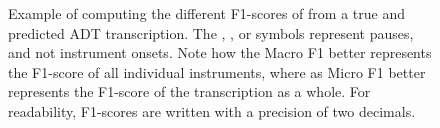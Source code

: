 \begin{figure}[H]
    \centering
    \hspace*{-0.5cm}
    
    \caption{Example of computing the different F1-scores of from a true and predicted \gls{ADT} transcription. The \HaPa, \ViPa, or \AcPa symbols represent pauses, and not instrument onsets. Note how the Macro F1 better represents the F1-score of all individual instruments, where as Micro F1 better represents the F1-score of the transcription as a whole. For readability, F1-scores are written with a precision of two decimals.}
    \label{F1Figure}
\end{figure}